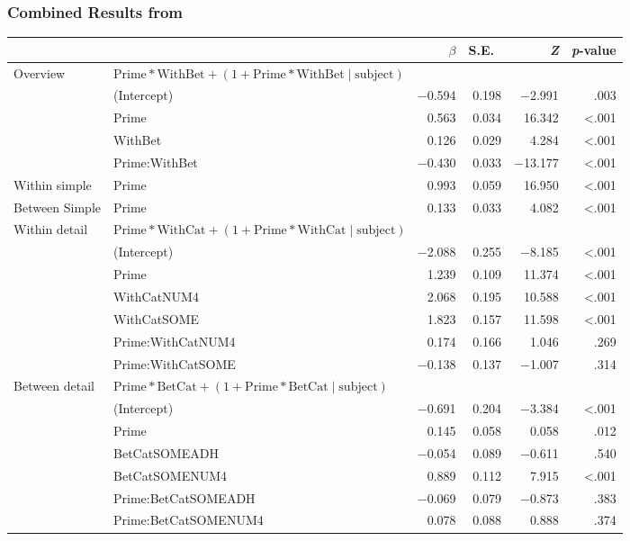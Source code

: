 \documentclass[noamssymb]{beamer}
\begin{document}
\begin{frame}

  \frametitle{{\ftf Combined Results from \citeauthor{Bott:2016aa}}}

    \begin{adjustbox}{width=1\textwidth,center=\textwidth}
    \begin{tabular}{llrrrr}
      \hline
      & & \(\beta\) & S.E.\ & \emph{Z} & \emph{p}-value  \\
      \hline
      Overview & \(\text{Prime} * \text{WithBet} + (1 + \text{Prime} * \text{WithBet} \mid \text{subject})\) & & & \\
      & (Intercept) & \(-\)0.594 & 0.198 & \(-\)2.991 & .003 \\
      & Prime & 0.563 & 0.034 & 16.342 & <.001 \\
      & WithBet & 0.126 & 0.029 & 4.284 & <.001 \\
      & Prime:WithBet & \(-\)0.430 & 0.033 & \(-\)13.177 & <.001 \\
      Within simple & Prime & 0.993 & 0.059 & 16.950 & <.001 \\
      Between Simple & Prime & 0.133 & 0.033 & 4.082 & <.001 \\
      Within detail & \multicolumn{2}{l}{\(\text{Prime} * \text{WithCat} + (1 + \text{Prime} * \text{WithCat} \mid \text{subject})\)}  & & & \\
      & (Intercept)  & \(-\)2.088 & 0.255 & \(-\)8.185 & <.001\\
      & Prime & 1.239 & 0.109 & 11.374 & <.001 \\
      & WithCatNUM4 & 2.068 & 0.195 & 10.588 & <.001 \\
      & WithCatSOME & 1.823 & 0.157 & 11.598 & <.001 \\
      & Prime:WithCatNUM4 & 0.174 & 0.166 & 1.046 & .269 \\
      & Prime:WithCatSOME & \(-\)0.138 & 0.137 & \(-\)1.007 & .314 \\
      Between detail & \multicolumn{2}{l}{\(\text{Prime} * \text{BetCat} + (1 + \text{Prime} * \text{BetCat} \mid \text{subject})\)}  & & & \\
      & (Intercept)  & \(-\)0.691 & 0.204 & \(-\)3.384 & <.001\\
      & Prime & 0.145 & 0.058 & 0.058 & .012 \\
      & BetCatSOMEADH & \(-\)0.054 & 0.089 & \(-\)0.611 & .540 \\
      & BetCatSOMENUM4 & 0.889 & 0.112 & 7.915 & <.001 \\
      & Prime:BetCatSOMEADH & \(-\)0.069 & 0.079 & \(-\)0.873 & .383 \\
      & Prime:BetCatSOMENUM4 & 0.078 & 0.088 & 0.888 & .374 \\
      \hline
    \end{tabular}
  \end{adjustbox}

\end{frame}
\end{document}
